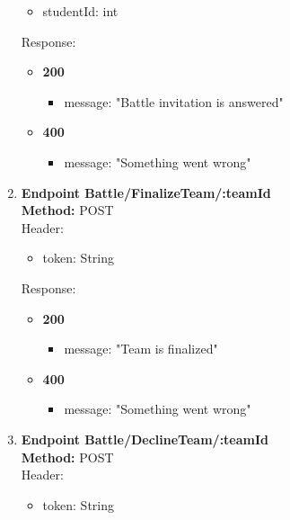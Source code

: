 \begin{enumerate}
\begin{itemize}
        \item studentId: int
    \end{itemize}
    Response:\\
    \begin{itemize}
        \item \textbf{200} \\
        \begin{itemize}
            \item message: "Battle invitation is answered"
        \end{itemize}
        \item \textbf{400} \\
        \begin{itemize}
            \item message: "Something went wrong"
        \end{itemize}
    \end{itemize}
    \item \textbf{Endpoint Battle/FinalizeTeam/:teamId} \\
    \textbf{Method:} POST \\
    Header:\\
    \begin{itemize}
        \item token: String
    \end{itemize}
    Response:\\
    \begin{itemize}
        \item \textbf{200} \\
        \begin{itemize}
            \item message: "Team is finalized"
        \end{itemize}
        \item \textbf{400} \\
        \begin{itemize}
            \item message: "Something went wrong"
        \end{itemize}
    \end{itemize}
    \item \textbf{Endpoint Battle/DeclineTeam/:teamId} \\
    \textbf{Method:} POST \\
    Header:\\
    \begin{itemize}
        \item token: String

\end{itemize}
\end{enumerate}
